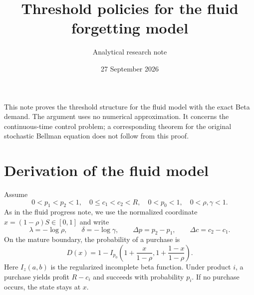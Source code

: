 \documentclass[11pt]{article}
\title{Threshold policies for the fluid forgetting model}
\author{Analytical research note}
\date{27 September 2026}
\begin{document}
\maketitle

This note proves the threshold structure for the fluid model with the exact
Beta demand. The argument uses no numerical approximation. It concerns the
continuous-time control problem; a corresponding theorem for the original
stochastic Bellman equation does not follow from this proof.

\section*{Derivation of the fluid model}
Assume
\begin{equation*}
0<p_1<p_2<1,\quad 0\le c_1<c_2<R,\quad
0<p_0<1,\quad 0<\rho,\gamma<1.
\end{equation*}
As in the fluid progress note, we use the normalized coordinate
$x=(1-\rho)S\in[0,1]$ and write
\begin{equation*}
\lambda=-\log\rho,\qquad \delta=-\log\gamma,\qquad
\Delta p=p_2-p_1,\qquad \Delta c=c_2-c_1.
\end{equation*}
On the mature boundary, the probability of a purchase is
\begin{equation*}
D(x)=1-I_{p_0}\!\left(1+\frac{x}{1-\rho},
                         1+\frac{1-x}{1-\rho}\right).
\end{equation*}
Here $I_z(a,b)$ is the regularized incomplete beta function. Under
product $i$, a purchase yields profit $R-c_i$ and succeeds with probability
$p_i$. If no purchase occurs, the state stays at $x$.
\end{document}
